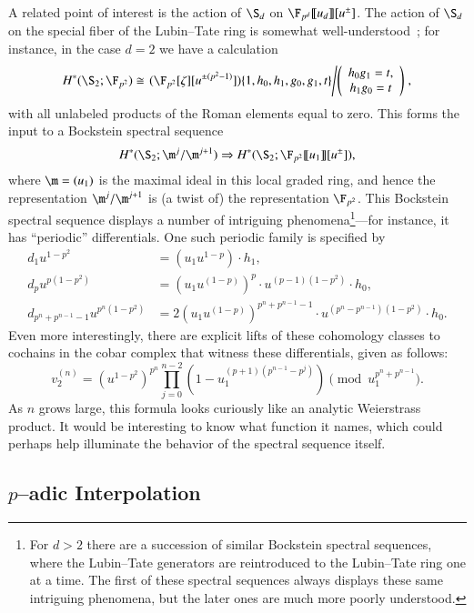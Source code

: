 A related point of interest is the action of $\S_d$ on $\F_{p^d}\ps{u_d}[u^\pm]$.  The action of $\S_d$ on the special fiber of the Lubin--Tate ring is somewhat well-understood~\cite{RavenelCohomologyStabAlgs}; for instance, in the case $d = 2$ we have a calculation \[H^*(\S_2; \F_{p^2}) \cong \left.(\F_{p^2}[\zeta][u^{\pm(p^2-1)}])\{1, h_0, h_1, g_0, g_1, t\}\middle/\left(\begin{array}{c} h_0 g_1 = t, \\ h_1 g_0 = t \end{array}\right)\right. ,\] with all unlabeled products of the Roman elements equal to zero.  This forms the input to a Bockstein spectral sequence \[H^*(\S_2; \m^j / \m^{j+1}) \Rightarrow H^*(\S_2; \F_{p^2}\ps{u_1}[u^\pm]),\] where $\m = (u_1)$ is the maximal ideal in this local graded ring, and hence the representation $\m^j / \m^{j+1}$ is (a twist of) the representation $\F_{p^2}$.  This Bockstein spectral sequence displays a number of intriguing phenomena\footnote{For $d > 2$ there are a succession of similar Bockstein spectral sequences, where the Lubin--Tate generators are reintroduced to the Lubin--Tate ring one at a time.  The first of these spectral sequences always displays these same intriguing phenomena, but the later ones are much more poorly understood.}---for instance, it has ``periodic'' differentials.  One such periodic family is specified by
\begin{align*}
d_1 u^{1-p^2} & = (u_1 u^{1-p}) \cdot h_1, \\
d_p u^{p(1-p^2)} & = (u_1 u^{(1-p)})^p \cdot u^{(p-1)(1-p^2)} \cdot h_0, \\
d_{p^n+p^{n-1}-1} u^{p^n(1-p^2)} & = 2 (u_1 u^{(1-p)})^{p^n + p^{n-1} - 1} \cdot u^{(p^n - p^{n-1})(1 - p^2)} \cdot h_0.
\end{align*}
Even more interestingly, there are explicit lifts of these cohomology classes to cochains in the cobar complex that witness these differentials, given as follows: \[v_2^{(n)} = (u^{1-p^2})^{p^n} \prod_{j=0}^{n-2} \left(1 - u_1^{(p+1)(p^{n-1} - p^j)} \right) \pmod{u_1^{p^n + p^{n-1}}}.\]  As $n$ grows large, this formula looks curiously like an analytic Weierstrass product.  It would be interesting to know what function it names, which could perhaps help illuminate the behavior of the spectral sequence itself.





\subsection*{$p$--adic Interpolation}

